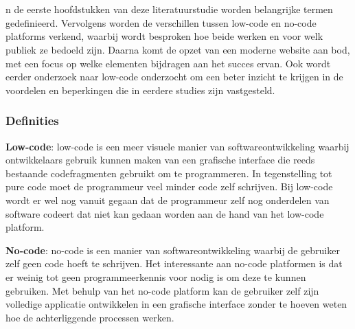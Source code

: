 \chapter{}%
\label{ch:stand-van-zaken}



n de eerste hoofdstukken van deze literatuurstudie worden belangrijke termen gedefinieerd. Vervolgens worden de verschillen tussen low-code en no-code platforms verkend, waarbij wordt besproken hoe beide werken en voor welk publiek ze bedoeld zijn. Daarna komt de opzet van een moderne website aan bod, met een focus op welke elementen bijdragen aan het succes ervan. Ook wordt eerder onderzoek naar low-code onderzocht om een beter inzicht te krijgen in de voordelen en beperkingen die in eerdere studies zijn vastgesteld.

\subsection{Definities}
\label{sec:Definities}

\textbf{Low-code}: low-code is een meer visuele manier van softwareontwikkeling waarbij ontwikkelaars gebruik kunnen maken van een grafische interface die reeds bestaande codefragmenten gebruikt om te programmeren. In tegenstelling tot pure code moet de programmeur veel minder code zelf schrijven. Bij low-code wordt er wel nog vanuit gegaan dat de programmeur zelf nog onderdelen van software codeert dat niet kan gedaan worden aan de hand van het low-code platform. \autocite{Spain2022}

\vspace{\baselineskip}

\textbf{No-code}: no-code is een manier van softwareontwikkeling waarbij de gebruiker zelf geen code hoeft te schrijven. Het interessante aan no-code platformen is dat er weinig tot geen programmeerkennis voor nodig is om deze te kunnen gebruiken. Met behulp van het no-code platform kan de gebruiker zelf zijn volledige applicatie ontwikkelen in een grafische interface zonder te hoeven weten hoe de achterliggende processen werken. \autocite{Kirvan2024}

